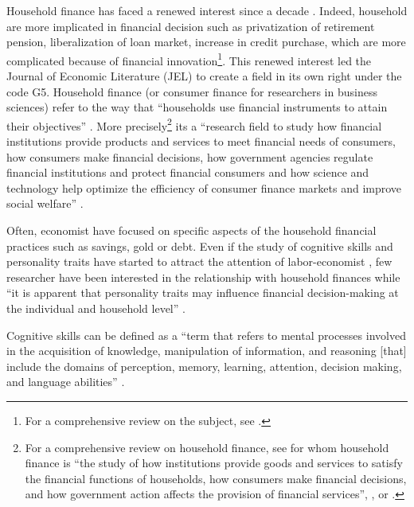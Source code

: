 \documentclass[a4paper, 11pt, onecolumn]{article}
\begin{document}

Household finance has faced a renewed interest since a decade \citep{Guiso2013}.
Indeed, household are more implicated in financial decision such as privatization of retirement pension, liberalization of loan market, increase in credit purchase, which are more complicated because of financial innovation\footnote{For a comprehensive review on the subject, see \cite{Tufano2003}.}.
This renewed interest led the Journal of Economic Literature (JEL) to create a field in its own right under the code G5.
Household finance (or consumer finance for researchers in business sciences) refer to the way that ``households use financial instruments to attain their objectives'' \citep{Campbell2006}.
More precisely\footnote{For a comprehensive review on household finance, see \cite{Tufano2009} for whom household finance is ``the study of how institutions provide goods and services to satisfy the financial functions of households, how consumers make financial decisions, and how government action affects the provision of financial services'', \cite{Guiso2013}, or \cite{Xiao2020}.}  its a ``research field to study how financial institutions provide products and services to meet financial needs of consumers, how consumers make financial decisions, how government agencies regulate financial institutions and protect financial consumers and how science and technology help optimize the efficiency of consumer finance markets and improve social welfare'' \citep{Xiao2020}.

Often, economist have focused on specific aspects of the household financial practices such as savings, gold or debt.
Even if the study of cognitive skills and personality traits have started to attract the attention of labor-economist \citep{Almlund2011}, few researcher have been interested in the relationship with household finances while ``it is apparent that personality traits may influence financial decision-making at the individual and household level'' \citep{Brown2014}.

Cognitive skills can be defined as a ``term that refers to mental processes involved in the acquisition of knowledge, manipulation of information, and reasoning [that] include the domains of perception, memory, learning, attention, decision making, and language abilities'' \citep{Kiely2014}.
\end{document}
